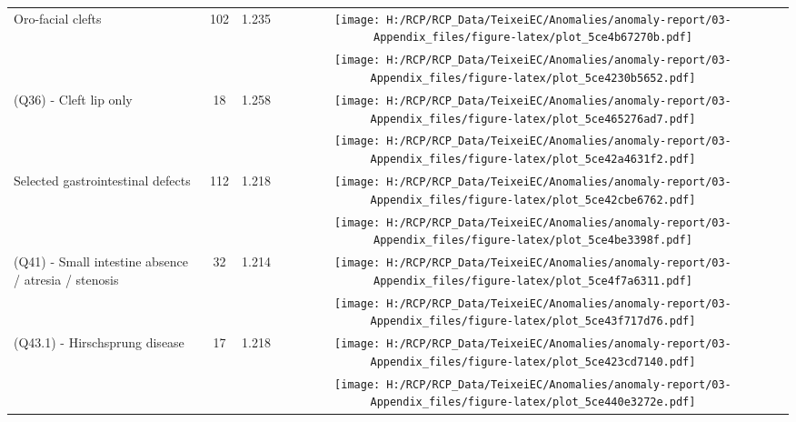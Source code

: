 \documentclass[
]{krantz}
\begin{document}
\begin{longtable}[t]{>{\raggedright\arraybackslash}m{4cm}cc>{}c}
Oro-facial clefts & 102 & 1.235 & \texttt{[image: H:/RCP/RCP\_Data/TeixeiEC/Anomalies/anomaly-report/03-Appendix\_files/figure-latex/plot\_5ce4b67270b.pdf]}\\
\addlinespace
\cellcolor{gray!6}{(Q35) - Cleft palate only} & \cellcolor{gray!6}{67} & \cellcolor{gray!6}{1.231} & \cellcolor{gray!6}{}\texttt{[image: H:/RCP/RCP\_Data/TeixeiEC/Anomalies/anomaly-report/03-Appendix\_files/figure-latex/plot\_5ce4230b5652.pdf]}\\
(Q36) - Cleft lip only & 18 & 1.258 & \texttt{[image: H:/RCP/RCP\_Data/TeixeiEC/Anomalies/anomaly-report/03-Appendix\_files/figure-latex/plot\_5ce465276ad7.pdf]}\\
\cellcolor{gray!6}{(Q37) - Cleft palate with cleft lip} & \cellcolor{gray!6}{39} & \cellcolor{gray!6}{1.231} & \cellcolor{gray!6}{}\texttt{[image: H:/RCP/RCP\_Data/TeixeiEC/Anomalies/anomaly-report/03-Appendix\_files/figure-latex/plot\_5ce42a4631f2.pdf]}\\
Selected gastrointestinal defects & 112 & 1.218 & \texttt{[image: H:/RCP/RCP\_Data/TeixeiEC/Anomalies/anomaly-report/03-Appendix\_files/figure-latex/plot\_5ce42cbe6762.pdf]}\\
\cellcolor{gray!6}{(Q39.0-Q39.4) - Oesophageal atresia / stenosis, tracheoesophageal fistula} & \cellcolor{gray!6}{29} & \cellcolor{gray!6}{1.218} & \cellcolor{gray!6}{}\texttt{[image: H:/RCP/RCP\_Data/TeixeiEC/Anomalies/anomaly-report/03-Appendix\_files/figure-latex/plot\_5ce4be3398f.pdf]}\\
\addlinespace
(Q41) - Small intestine absence / atresia / stenosis & 32 & 1.214 & \texttt{[image: H:/RCP/RCP\_Data/TeixeiEC/Anomalies/anomaly-report/03-Appendix\_files/figure-latex/plot\_5ce4f7a6311.pdf]}\\
\cellcolor{gray!6}{(Q42.0-Q42.3) - Ano-rectal absence / atresia / stenosis} & \cellcolor{gray!6}{31} & \cellcolor{gray!6}{1.224} & \cellcolor{gray!6}{}\texttt{[image: H:/RCP/RCP\_Data/TeixeiEC/Anomalies/anomaly-report/03-Appendix\_files/figure-latex/plot\_5ce43f717d76.pdf]}\\
(Q43.1) - Hirschsprung disease & 17 & 1.218 & \texttt{[image: H:/RCP/RCP\_Data/TeixeiEC/Anomalies/anomaly-report/03-Appendix\_files/figure-latex/plot\_5ce423cd7140.pdf]}\\
\cellcolor{gray!6}{(Q44.2) - Atresia of bile ducts} & \cellcolor{gray!6}{9} & \cellcolor{gray!6}{1.205} & \cellcolor{gray!6}{}\texttt{[image: H:/RCP/RCP\_Data/TeixeiEC/Anomalies/anomaly-report/03-Appendix\_files/figure-latex/plot\_5ce440e3272e.pdf]}\\

\end{longtable}
\end{document}

